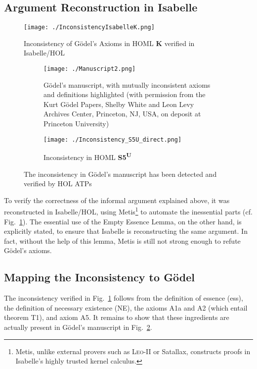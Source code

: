 \documentclass{article}
\newcommand{\logic}[1]{\textbf{#1}\xspace}
\newcommand{\K}{\logic{K}}
\newcommand{\SFiveU}{\logic{S5\textsuperscript{U}}}
\begin{document}
\subsection{Argument Reconstruction in Isabelle}  \label{sec:arg2}
\begin{figure}[t]
\centerline{\texttt{[image: ./InconsistencyIsabelleK.png]}}
\caption{Inconsistency of G\"odel's Axioms in HOML \K verified in Isabelle/HOL} \label{InconsistencyIsabelleK}
\end{figure}
\begin{figure*}[t]
  \centering
  \begin{subfigure}[t]{0.715\textwidth}
    \texttt{[image: ./Manuscript2.png]}
    \caption{G\"{o}del's manuscript, with mutually inconsistent axioms and
      definitions highlighted (with permission from the Kurt G\"odel Papers, Shelby White and Leon Levy Archives Center, Princeton, NJ, USA, on deposit at Princeton University)} \label{GoedelScript} 
  \end{subfigure}
   \begin{subfigure}[t]{0.28\textwidth}
     \texttt{[image: ./Inconsistency\_S5U\_direct.png]}
     \caption{Inconsistency in HOML \SFiveU} \label{Inconsistency_S5U} 
   \end{subfigure}
 \caption{The inconsistency in G\"{o}del's manuscript has been
   detected and verified by HOL ATPs} 
\end{figure*}
To verify the correctness of the informal argument explained above, it
was reconstructed in Isabelle/HOL, using Metis\footnote{Metis, unlike
  external provers such as \textsc{Leo-II} or Satallax, 
  constructs proofs in Isabelle's highly trusted kernel calculus.} to automate the
inessential parts (cf. Fig.~\ref {InconsistencyIsabelleK}). The essential use of the Empty Essence Lemma, on
the other hand, is explicitly stated, to ensure that Isabelle is
reconstructing the same argument. In fact, without the help of this
lemma, Metis is still not strong enough to refute G\"odel's
axioms.


\subsection{Mapping the Inconsistency to G\"odel}

The inconsistency verified in Fig.~\ref{InconsistencyIsabelleK} follows from the definition of
essence (ess), the definition of necessary existence (NE), the
axioms A1a and A2 (which entail theorem T1), and axiom A5. It remains to show that
these ingredients are actually present in G\"odel's manuscript in
Fig.~\ref{GoedelScript}. 
\end{document}
